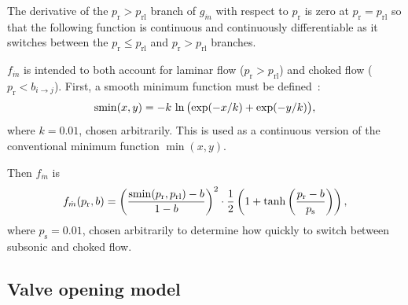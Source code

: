 The derivative of the $p_\text{r} > p_\text{rl}$ branch of $g_{\dot{m}}$ with respect to $p_\text{r}$ is zero at $p_\text{r} = p_\text{rl}$ so that the following function is continuous and continuously differentiable as it switches between the $p_\text{r} \leq p_\text{rl}$ and $p_\text{r} > p_\text{rl}$ branches.

$f_{\dot{m}}$ is intended to both account for laminar flow ($p_\text{r} > p_\text{rl}$) and choked flow ($p_\text{r} < b_{i \rightarrow j}$).
First, a smooth minimum function must be defined~\citep{quilez_smooth_2013}:
\begin{equation}
    \smin(x, y) = -k \, \ln{\bigl(\exp(-x/k) + \exp(-y/k)\bigr)}, %
\end{equation}
where $k = 0.01$, chosen arbitrarily.
This is used as a continuous version of the conventional minimum function $\min(x, y)$.

Then $f_{\dot{m}}$ is
\begin{equation}
    f_{\dot{m}}(p_\text{r}, b) = {\left(\frac{\operatorname{smin}(p_\text{r}, p_\text{rl}) - b}{1 - b}\right)}^2
                                    \cdot \frac{1}{2} \left(1 + \tanh\left(\frac{p_\text{r} - b}{p_\text{s}}\right)\right),
\end{equation}
where $p_\text{s} = 0.01$, chosen arbitrarily to determine how quickly to switch between subsonic and choked flow.


\subsection{Valve opening model}\label{valve-opening-model}


